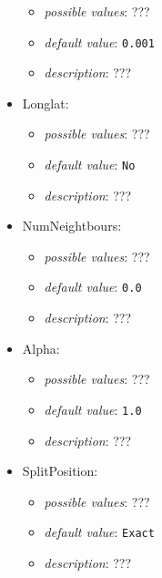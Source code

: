 \documentclass{article}
\begin{document}
\begin{itemize}
           \begin{itemize}
                \item \emph{possible values}: ???
                \item \emph{default value}: \texttt{0.001}
                \item \emph{description}: ???
           \end{itemize}
    \item Longlat:
           \begin{itemize}
                \item \emph{possible values}: ???
                \item \emph{default value}: \texttt{No}
                \item \emph{description}: ???
           \end{itemize}
    \item NumNeightbours:
           \begin{itemize}
                \item \emph{possible values}: ???
                \item \emph{default value}: \texttt{0.0}
                \item \emph{description}: ???
           \end{itemize}
    \item Alpha:
           \begin{itemize}
                \item \emph{possible values}: ???
                \item \emph{default value}: \texttt{1.0}
                \item \emph{description}: ???
           \end{itemize}
    \item SplitPosition:
           \begin{itemize}
                \item \emph{possible values}: ???
                \item \emph{default value}: \texttt{Exact}
                \item \emph{description}: ???
           \end{itemize}
\end{itemize}
\end{document}
